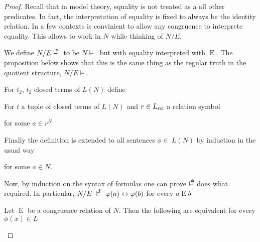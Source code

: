 \begin{proof}
Recall that in model theory, equality is not treated as a all other predicates.
In fact, the interpretation of equality is fixed to always be the identity relation.
In a few contexts is convinient to allow any congruence to interprete equality.
This allows to work in $N$ while thinking of $N/E$.

We define $N/E\pmodels\;$ to be $N\models\;$ but with equality interpreted with $\mathrel{E}$.
The proposition below shows that this is the same thing as the regular truth in the quotient structure,  $N/E\models$.

\begin{definition}\label{def_pseudostructure}
For $t_2$, $t_2$ closed terms of $L(N)$ define


For $t$ a tuple of closed terms of $L(N)$ and $r\in L_{\rm rel}$ a relation symbol

\quad for some $a\in r^N$

Finally the definition is extended to all sentences $\phi\in\ L(N)$ by induction in the usual way



\quad for some $a\in N$.
\end{definition}

% 
% 
% 


Now, by induction on the syntax of formulas one can prove $\pmodels$ does what required.
In particular, $N/E\ \pmodels\ \phi(a)\iff\phi(b)$ for every $a\mathrel{E} b$.

\begin{proposition}\label{prop_pseudomodel}
Let $\mathrel{E}$ be a congruence relation of $N$.
Then the following are equivalent for every $\phi(x)\in L$


\end{proposition}
\end{proof}
